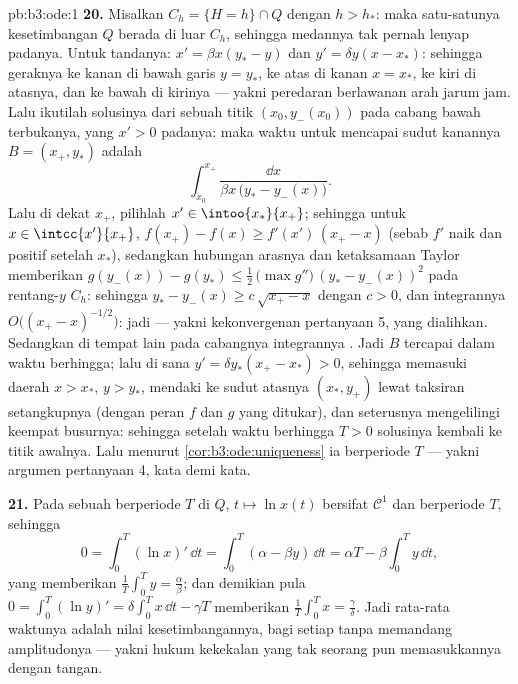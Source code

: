 \begin{solution}{pb:b3:ode:1}
\textbf{20.} Misalkan $C_h = \{H = h\}\cap Q$ dengan $h > h_*$: maka
satu-satunya kesetimbangan $Q$ berada di luar $C_h$, sehingga medannya tak pernah
lenyap padanya. Untuk tandanya: $x' = \beta x(y_* - y)$ dan $y' =
\delta y(x - x_*)$: sehingga geraknya ke kanan di bawah garis $y
= y_*$, ke atas di kanan $x = x_*$, ke kiri di atasnya, dan ke bawah di
kirinya --- yakni peredaran berlawanan arah jarum jam. Lalu ikutilah
solusinya dari sebuah titik $(x_0, y_-(x_0))$ pada cabang bawah
terbukanya, yang $x' > 0$ padanya: maka waktu untuk mencapai sudut kanannya
$B = (x_+, y_*)$ adalah
\[
\int_{x_0}^{x_+}\frac{\dd x}{\beta x\,\bigl(y_* -
y_-(x)\bigr)} .
\]
Lalu di dekat $x_+$, pilihlah $x' \in \intoo{x_*}{x_+}$; sehingga untuk $x \in
\intcc{x'}{x_+}$, $f(x_+) - f(x) \geq f'(x')\,(x_+ - x)$
(sebab $f'$ naik dan positif setelah $x_*$), sedangkan
hubungan arasnya dan ketaksamaan Taylor memberikan $g(y_-(x)) -
g(y_*) \leq \frac12\,\bigl(\max g''\bigr)\,(y_* -
y_-(x))^2$ pada rentang-$y$  $C_h$: sehingga $y_* -
y_-(x) \geq c\,\sqrt{x_+ - x}$ dengan $c > 0$, dan
integrannya $O\bigl((x_+ - x)^{-1/2}\bigr)$: jadi  ---
yakni kekonvergenan pertanyaan 5, yang dialihkan. Sedangkan di tempat lain pada
cabangnya integrannya . Jadi $B$ tercapai dalam
waktu berhingga; lalu di sana $y' = \delta y_*(x_+ - x_*) > 0$, sehingga
 memasuki daerah $x > x_*$, $y > y_*$, mendaki ke
sudut atasnya $(x_*, y_+)$ lewat taksiran setangkupnya (dengan peran
$f$ dan $g$ yang ditukar), dan seterusnya mengelilingi keempat busurnya:
sehingga setelah waktu berhingga $T > 0$ solusinya kembali ke
titik awalnya. Lalu menurut \cref{cor:b3:ode:uniqueness} ia
berperiode $T$ --- yakni argumen pertanyaan 4, kata demi kata.

\textbf{21.} Pada sebuah  berperiode $T$ di $Q$, $t \mapsto \ln
x(t)$ bersifat $\mathcal C^1$ dan berperiode $T$, sehingga
\[
0 = \int_0^T(\ln x)'\,\dd t
= \int_0^T(\alpha - \beta y)\,\dd t
= \alpha T - \beta\int_0^Ty\,\dd t ,
\]
yang memberikan $\frac1T\int_0^Ty = \frac\alpha\beta$; dan demikian pula $0 =
\int_0^T(\ln y)' = \delta\int_0^Tx\,\dd t - \gamma T$ memberikan
$\frac1T\int_0^Tx = \frac\gamma\delta$. Jadi rata-rata waktunya
adalah nilai kesetimbangannya, bagi setiap  tanpa memandang
amplitudonya --- yakni hukum kekekalan yang tak seorang pun memasukkannya dengan tangan.


\end{solution}
